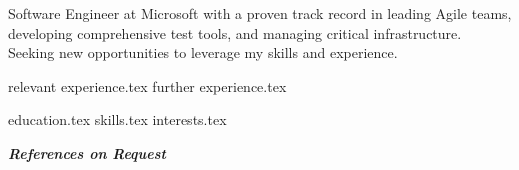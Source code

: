 \documentclass[letterpaper,11pt]{article}
\begin{document}
\thispagestyle{empty}

\vspace{0.8cm} 

Software Engineer at Microsoft with a proven track record in leading Agile teams, developing comprehensive test tools, and managing critical infrastructure. Seeking new opportunities to leverage my skills and experience.


{relevant experience.tex}
{further experience.tex}


\newpage
{education.tex}
{skills.tex}
{interests.tex}
\thispagestyle{empty}

\vspace*{\fill}
\centering
\textit{\textbf{References on Request}}
\end{document}
